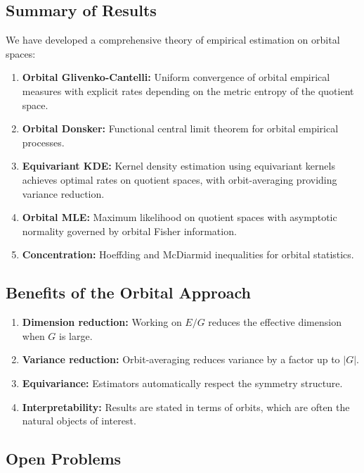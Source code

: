 \documentclass[11pt]{article}
\begin{document}
\subsection{Summary of Results}

We have developed a comprehensive theory of empirical estimation on orbital spaces:
\begin{enumerate}
\item \textbf{Orbital Glivenko-Cantelli:} Uniform convergence of orbital empirical measures with explicit rates depending on the metric entropy of the quotient space.
\item \textbf{Orbital Donsker:} Functional central limit theorem for orbital empirical processes.
\item \textbf{Equivariant KDE:} Kernel density estimation using equivariant kernels achieves optimal rates on quotient spaces, with orbit-averaging providing variance reduction.
\item \textbf{Orbital MLE:} Maximum likelihood on quotient spaces with asymptotic normality governed by orbital Fisher information.
\item \textbf{Concentration:} Hoeffding and McDiarmid inequalities for orbital statistics.
\end{enumerate}

\subsection{Benefits of the Orbital Approach}

\begin{enumerate}
\item \textbf{Dimension reduction:} Working on $E/G$ reduces the effective dimension when $G$ is large.
\item \textbf{Variance reduction:} Orbit-averaging reduces variance by a factor up to $|G|$.
\item \textbf{Equivariance:} Estimators automatically respect the symmetry structure.
\item \textbf{Interpretability:} Results are stated in terms of orbits, which are often the natural objects of interest.
\end{enumerate}

\subsection{Open Problems}
\end{document}
